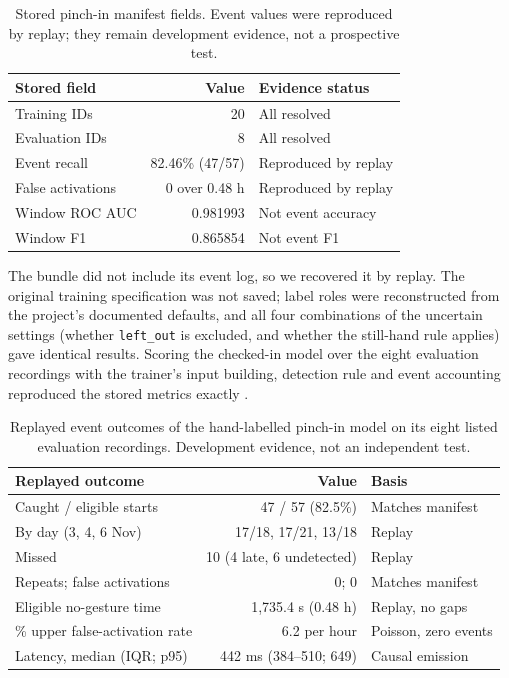 \begin{table}[t]
\centering\small
\caption{Stored pinch-in manifest fields. Event values were reproduced by replay; they remain development evidence, not a prospective test.}
\begin{tabularx}{\linewidth}{@{}>{\raggedright\arraybackslash}Xr>{\raggedright\arraybackslash}X@{}}
\toprule
\textbf{Stored field} & \textbf{Value} & \textbf{Evidence status} \\
\midrule
Training IDs & 20 & All resolved \\
Evaluation IDs & 8 & All resolved \\
Event recall & 82.46\% (47/57) & Reproduced by replay \\
False activations & 0 over 0.48 h & Reproduced by replay \\
Window ROC AUC & 0.981993 & Not event accuracy \\
Window F1 & 0.865854 & Not event F1 \\
\bottomrule
\end{tabularx}
\end{table}

The bundle did not include its event log, so we recovered it by replay. The original training specification was not saved; label roles were reconstructed from the project's documented defaults, and all four combinations of the uncertain settings (whether \nolinkurl{left_out} is excluded, and whether the still-hand rule applies) gave identical results. Scoring the checked-in model over the eight evaluation recordings with the trainer's input building, detection rule and event accounting reproduced the stored metrics exactly \cite{repository}.

\begin{table}[t]
\centering\small
\caption{Replayed event outcomes of the hand-labelled pinch-in model on its eight listed evaluation recordings. Development evidence, not an independent test.}
\begin{tabularx}{\linewidth}{@{}>{\raggedright\arraybackslash}Xr>{\raggedright\arraybackslash}X@{}}
\toprule
\textbf{Replayed outcome} & \textbf{Value} & \textbf{Basis} \\
\midrule
Caught / eligible starts & 47 / 57 (82.5\%) & Matches manifest \\
By day (3, 4, 6 Nov) & 17/18, 17/21, 13/18 & Replay \\
Missed & 10 (4 late, 6 undetected) & Replay \\
Repeats; false activations & 0; 0 & Matches manifest \\
Eligible no-gesture time & 1,735.4 s (0.48 h) & Replay, no gaps \\
95\% upper false-activation rate & 6.2 per hour & Poisson, zero events \\
Latency, median (IQR; p95) & 442 ms (384--510; 649) & Causal emission \\
\bottomrule
\end{tabularx}
\end{table}

